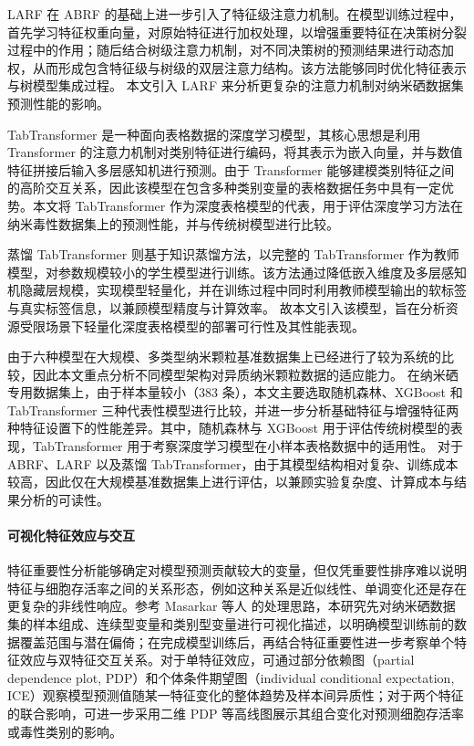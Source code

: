 LARF 在 ABRF 的基础上进一步引入了特征级注意力机制。在模型训练过程中，首先学习特征权重向量，对原始特征进行加权处理，以增强重要特征在决策树分裂过程中的作用；随后结合树级注意力机制，对不同决策树的预测结果进行动态加权，从而形成包含特征级与树级的双层注意力结构。该方法能够同时优化特征表示与树模型集成过程。
本文引入 LARF 来分析更复杂的注意力机制对纳米硒数据集预测性能的影响。

TabTransformer 是一种面向表格数据的深度学习模型，其核心思想是利用 Transformer 的注意力机制对类别特征进行编码，将其表示为嵌入向量，并与数值特征拼接后输入多层感知机进行预测。由于 Transformer 能够建模类别特征之间的高阶交互关系，因此该模型在包含多种类别变量的表格数据任务中具有一定优势。本文将 TabTransformer 作为深度表格模型的代表，用于评估深度学习方法在纳米毒性数据集上的预测性能，并与传统树模型进行比较。

蒸馏 TabTransformer 则基于知识蒸馏方法，以完整的 TabTransformer 作为教师模型，对参数规模较小的学生模型进行训练。该方法通过降低嵌入维度及多层感知机隐藏层规模，实现模型轻量化，并在训练过程中同时利用教师模型输出的软标签与真实标签信息，以兼顾模型精度与计算效率。
故本文引入该模型，旨在分析资源受限场景下轻量化深度表格模型的部署可行性及其性能表现。

由于六种模型在大规模、多类型纳米颗粒基准数据集上已经进行了较为系统的比较，因此本文重点分析不同模型架构对异质纳米颗粒数据的适应能力。
在纳米硒专用数据集上，由于样本量较小（383 条），本文主要选取随机森林、XGBoost 和 TabTransformer 三种代表性模型进行比较，并进一步分析基础特征与增强特征两种特征设置下的性能差异。其中，随机森林与 XGBoost 用于评估传统树模型的表现，TabTransformer 用于考察深度学习模型在小样本表格数据中的适用性。
对于 ABRF、LARF 以及蒸馏 TabTransformer，由于其模型结构相对复杂、训练成本较高，因此仅在大规模基准数据集上进行评估，以兼顾实验复杂度、计算成本与结果分析的可读性。

\paragraph{可视化特征效应与交互}
特征重要性分析能够确定对模型预测贡献较大的变量，但仅凭重要性排序难以说明特征与细胞存活率之间的关系形态，例如这种关系是近似线性、单调变化还是存在更复杂的非线性响应。参考 Masarkar 等人 \cite{masarkar2024} 的处理思路，本研究先对纳米硒数据集的样本组成、连续型变量和类别型变量进行可视化描述，以明确模型训练前的数据覆盖范围与潜在偏倚；在完成模型训练后，再结合特征重要性进一步考察单个特征效应与双特征交互关系。对于单特征效应，可通过部分依赖图（partial dependence plot, PDP）和个体条件期望图（individual conditional expectation, ICE）观察模型预测值随某一特征变化的整体趋势及样本间异质性；对于两个特征的联合影响，可进一步采用二维 PDP 等高线图展示其组合变化对预测细胞存活率或毒性类别的影响。

